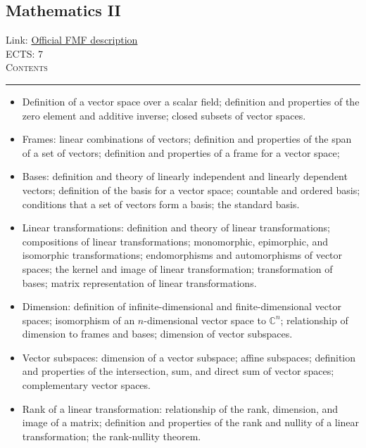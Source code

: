 \documentclass[11pt, a4paper]{article}
\newenvironment{course}[3]{
\subsection{#1}%
Link: \href{#2}{Official FMF description}\\%
ECTS: #3%
\vspace{1ex}
\\
{\large \textsc{Contents}}\\[-0.9ex]%
\rule{\textwidth}{0.5pt}
\vspace{-3ex}
}
{}
\newenvironment{chapter}[1]{
\begin{tcolorbox}[title=#1, breakable]
}
{\end{tcolorbox}}
\begin{document}
\begin{course}{Mathematics II}{https://www.fmf.uni-lj.si/en/study-physics/programmes/1fiz/2020/7000777/courses/521/}{7}
\begin{chapter}{Matrices}
\begin{itemize}
        \end{itemize}
    \end{chapter}

    \begin{chapter}{Finite-dimensional vector spaces}
        \begin{itemize}
        
            \item Definition of a vector space over a scalar field; definition and properties of the zero element and additive inverse; closed subsets of vector spaces.

            \item Frames: linear combinations of vectors; definition and properties of the span of a set of vectors; definition and properties of a frame for a vector space; 

            \item Bases: definition and theory of linearly independent and linearly dependent vectors; definition of the basis for a vector space; countable and ordered basis; conditions that a set of vectors form a basis; the standard basis.

            \item Linear transformations: definition and theory of linear transformations; compositions of linear transformations; monomorphic, epimorphic, and isomorphic transformations; endomorphisms and automorphisms of vector spaces; the kernel and image of linear transformation; transformation of bases; matrix representation of linear transformations.

            \item Dimension: definition of infinite-dimensional and finite-dimensional vector spaces; 
            isomorphism of an $ n $-dimensional vector space to $ \mathbb{C}^{n} $;
            relationship of dimension to frames and bases;
            dimension of vector subspaces.

            \item Vector subspaces: dimension of a vector subspace; affine subspaces; definition and properties of the intersection, sum, and direct sum of vector spaces; complementary vector spaces.

            \item Rank of a linear transformation: relationship of the rank, dimension, and image of a matrix; definition and properties of the rank and nullity of a linear transformation; the rank-nullity theorem.

        \end{itemize}
    \end{chapter}


\end{course}
\end{document}
